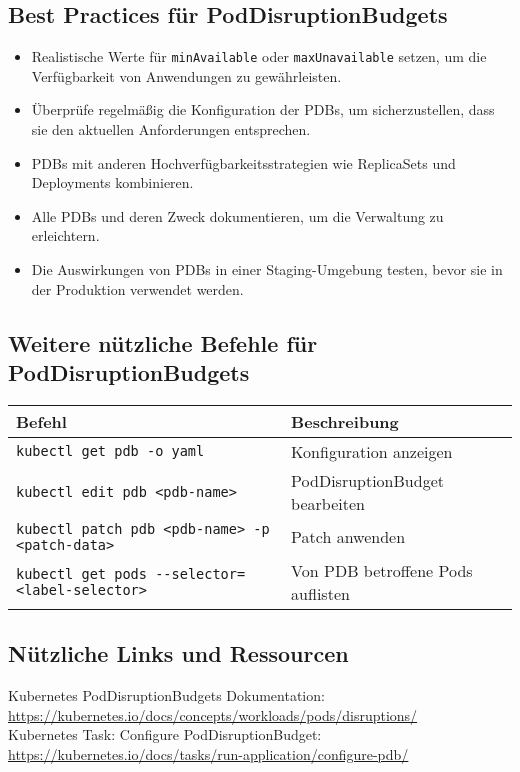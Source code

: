 \subsection{Best Practices für PodDisruptionBudgets}
\begin{itemize}
    \item Realistische Werte für \texttt{minAvailable} oder \texttt{maxUnavailable} setzen, um die Verfügbarkeit von Anwendungen zu gewährleisten.
    \item Überprüfe regelmäßig die Konfiguration der PDBs, um sicherzustellen, dass sie den aktuellen Anforderungen entsprechen.
    \item PDBs mit anderen Hochverfügbarkeitsstrategien wie ReplicaSets und Deployments kombinieren.
    \item Alle PDBs und deren Zweck dokumentieren, um die Verwaltung zu erleichtern.
    \item Die Auswirkungen von PDBs in einer Staging-Umgebung testen, bevor sie in der Produktion verwendet werden.
\end{itemize}

\subsection{Weitere nützliche Befehle für PodDisruptionBudgets}
\begin{tabular}{|p{}|p{}|}
\hline
\textbf{Befehl} & \textbf{Beschreibung} \\
\hline
\texttt{kubectl get pdb -o yaml} & Konfiguration anzeigen \\
\texttt{kubectl edit pdb <pdb-name>} & PodDisruptionBudget bearbeiten \\
\texttt{kubectl patch pdb <pdb-name> -p <patch-data>} & Patch anwenden \\
\texttt{kubectl get pods {-}{-}selector=<label-selector>} & Von PDB betroffene Pods auflisten \\
\hline
\end{tabular}

\subsection*{Nützliche Links und Ressourcen}
Kubernetes PodDisruptionBudgets Dokumentation:\\
\url{https://kubernetes.io/docs/concepts/workloads/pods/disruptions/}\\
Kubernetes Task: Configure PodDisruptionBudget:\\
\url{https://kubernetes.io/docs/tasks/run-application/configure-pdb/}

